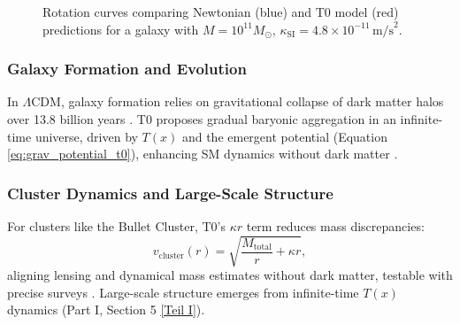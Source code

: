 \documentclass[twocolumn,aps,prl]{revtex4-2}
\newcommand{\Tfield}{T(x)}
\newcommand{\LCDM}{\Lambda\text{CDM}}
\begin{document}
	\begin{figure}[ht]
		\centering
		\caption{Rotation curves comparing Newtonian (blue) and T0 model (red) predictions for a galaxy with \(M = 10^{11} M_{\odot}\), \(\kappa_{\text{SI}} = 4.8 \times 10^{-11} \, \text{m/s}^2\).}
		\label{fig:rotation_curves}
	\end{figure}
	
	\subsubsection{Galaxy Formation and Evolution}
	In \(\LCDM\), galaxy formation relies on gravitational collapse of dark matter halos over 13.8 billion years \cite{Planck2020}. T0 proposes gradual baryonic aggregation in an infinite-time universe, driven by \(\Tfield\) and the emergent potential (Equation \ref{eq:grav_potential_t0}), enhancing SM dynamics without dark matter \cite{pascher_galaxies_2025}.
	
	\subsubsection{Cluster Dynamics and Large-Scale Structure}
	For clusters like the Bullet Cluster, T0’s \(\kappa r\) term reduces mass discrepancies:
	\begin{equation}
		v_{\text{cluster}}(r) = \sqrt{\frac{M_{\text{total}}}{r} + \kappa r},
		\label{eq:cluster_velocity}
	\end{equation}
	aligning lensing and dynamical mass estimates without dark matter, testable with precise surveys \cite{pascher_emergente_2025}. Large-scale structure emerges from infinite-time \(\Tfield\) dynamics (Part I, Section 5 \href{https://github.com/jpascher/T0-Time-Mass-Duality/tree/main/2/pdf/English/Bridging Quantum Mechanics and Relativity through Time-Mass Duality Part I Theoretical Foundations_en.pdf}{[Teil I]}).
	
\end{document}
